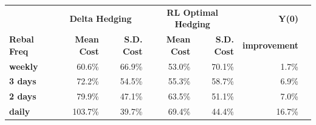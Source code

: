 \documentclass{article}
\begin{document}
\begin{table}[htbp]
\centering
\vspace{0.4em}
\begin{tabular}{lrrrrrr}
\hline
 & \multicolumn{2}{c}{\textbf{Delta Hedging}} & \multicolumn{2}{c}{\textbf{RL Optimal Hedging}} & \textbf{Y(0)} \\
\textbf{Rebal Freq} & \textbf{Mean Cost} & \textbf{S.D. Cost} & \textbf{Mean Cost} & \textbf{S.D. Cost} & \textbf{improvement} \\
\hline
\textbf{weekly} & 60.6\% & 66.9\% & 53.0\% & 70.1\% & 1.7\% \\
\textbf{3 days} & 72.2\% & 54.5\% & 55.3\% & 58.7\% & 6.9\% \\
\textbf{2 days} & 79.9\% & 47.1\% & 63.5\% & 51.1\% & 7.0\% \\
\textbf{daily} & 103.7\% & 39.7\% & 69.4\% & 44.4\% & 16.7\% \\
\hline
\end{tabular}
\end{table}
\end{document}
